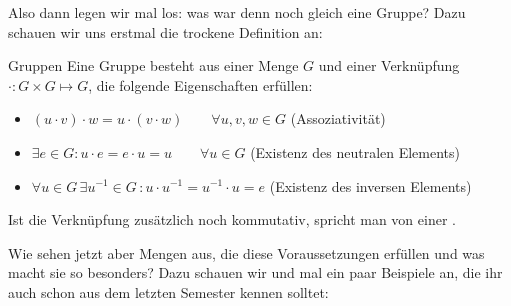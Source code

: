 Also dann legen wir mal los: was war denn noch gleich eine Gruppe? Dazu schauen wir uns erstmal die trockene Definition an:
\begin{Wiederholung}
{Gruppen}
Eine Gruppe besteht aus einer Menge $G$ und einer Verknüpfung $\cdot:G\times G \mapsto G$, die folgende Eigenschaften erfüllen: \\

\begin{itemize}
    \item $(u\cdot v)\cdot w = u\cdot (v\cdot w) \qquad \forall u,v,w \in G$ \qquad (Assoziativität)
    \item $\exists e\in G: u\cdot e = e\cdot u = u \qquad \forall u\in G$ \qquad (Existenz des neutralen Elements)
    \item $\forall u\in G \, \exists u^{-1} \in G\,: u\cdot u^{-1} = u^{-1} \cdot u = e$ \qquad (Existenz des inversen Elements) \\
\end{itemize} 

Ist die Verknüpfung zusätzlich noch kommutativ, spricht man von einer .
\end{Wiederholung}
Wie sehen jetzt aber Mengen aus, die diese Voraussetzungen erfüllen und was macht sie so besonders? Dazu schauen wir und mal ein paar Beispiele an, die ihr auch schon aus dem letzten Semester kennen solltet:
